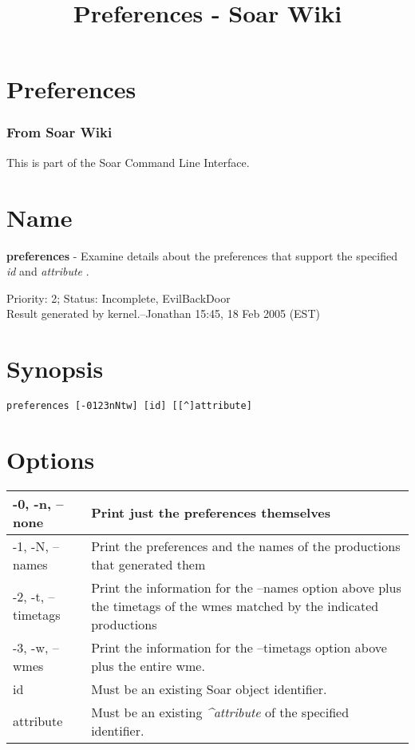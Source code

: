 \documentclass[10pt]{article}
\title{Preferences - Soar Wiki}
\begin{document}
\section*{Preferences}
\subsubsection*{From Soar Wiki}


 This is part of the Soar Command Line Interface. 
\section*{ Name }


 \textbf{preferences}
 - Examine details about the preferences that support the specified \emph{id}
 and \emph{attribute}
. 


 Priority: 2; Status: Incomplete, EvilBackDoor\\ 
Result generated by kernel.--Jonathan 15:45, 18 Feb 2005 (EST) 
\section*{ Synopsis }
\begin{verbatim}
preferences [-0123nNtw] [id] [[^]attribute]

\end{verbatim}
\section*{ Options }


\begin{tabular}{|p{1in}|p{5in}|}
\hline 
 -0, -n, --none  & Print just the preferences themselves  \\
 \hline 
 -1, -N, --names  & Print the preferences and the names of the productions that generated them  \\
 \hline 
 -2, -t, --timetags  & Print the information for the --names option above plus the timetags of the wmes matched by the indicated productions  \\
 \hline 
 -3, -w, --wmes  & Print the information for the --timetags option above plus the entire wme.  \\
 \hline 
id & Must be an existing Soar object identifier.  \\
 \hline 
attribute & Must be an existing \emph{\^{}attribute}
 of the specified identifier.  \\
 \hline 

\end{tabular}
\end{document}
